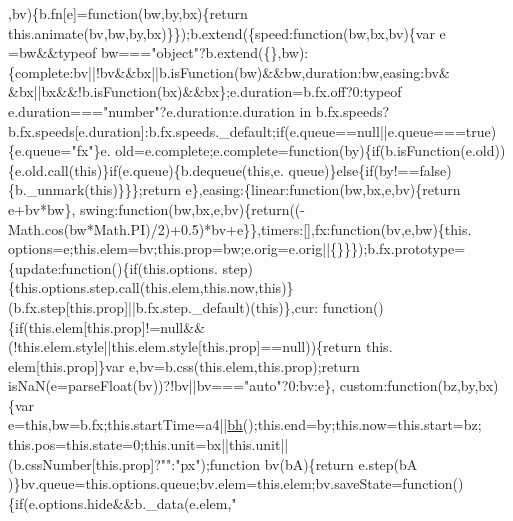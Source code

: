 \begin{DoxyCode}
      ,bv)\{b.fn[e]=\textcolor{keyword}{function}(bw,by,bx)\{\textcolor{keywordflow}{return} this.animate(bv,bw,by,bx)\}\});b.extend(\{speed:\textcolor{keyword}{function}(bw,bx,bv)\{var e
      =bw&&typeof bw===\textcolor{stringliteral}{"object"}?b.extend(\{\},bw):\{complete:bv||!bv&&bx||b.isFunction(bw)&&bw,duration:bw,easing:bv&
      &bx||bx&&!b.isFunction(bx)&&bx\};e.duration=b.fx.off?0:typeof e.duration===\textcolor{stringliteral}{"number"}?e.duration:e.duration in 
      b.fx.speeds?b.fx.speeds[e.duration]:b.fx.speeds.\_default;\textcolor{keywordflow}{if}(e.queue==null||e.queue===\textcolor{keyword}{true})\{e.queue=\textcolor{stringliteral}{"fx"}\}e.
      old=e.complete;e.complete=\textcolor{keyword}{function}(by)\{\textcolor{keywordflow}{if}(b.isFunction(e.old))\{e.old.call(\textcolor{keyword}{this})\}\textcolor{keywordflow}{if}(e.queue)\{b.dequeue(\textcolor{keyword}{this},e.
      queue)\}\textcolor{keywordflow}{else}\{\textcolor{keywordflow}{if}(by!==\textcolor{keyword}{false})\{b.\_unmark(\textcolor{keyword}{this})\}\}\};\textcolor{keywordflow}{return} e\},easing:\{linear:\textcolor{keyword}{function}(bw,bx,e,bv)\{\textcolor{keywordflow}{return} e+bv*bw\},
      swing:\textcolor{keyword}{function}(bw,bx,e,bv)\{\textcolor{keywordflow}{return}((-Math.cos(bw*Math.PI)/2)+0.5)*bv+e\}\},timers:[],fx:\textcolor{keyword}{function}(bv,e,bw)\{this.
      options=e;this.elem=bv;this.prop=bw;e.orig=e.orig||\{\}\}\});b.fx.prototype=\{update:\textcolor{keyword}{function}()\{\textcolor{keywordflow}{if}(this.options.
      step)\{this.options.step.call(this.elem,this.now,\textcolor{keyword}{this})\}(b.fx.step[this.prop]||b.fx.step.\_default)(\textcolor{keyword}{this})\},cur:\textcolor{keyword}{
      function}()\{\textcolor{keywordflow}{if}(this.elem[this.prop]!=null&&(!this.elem.style||\textcolor{keyword}{this}.elem.style[\textcolor{keyword}{this}.prop]==null))\{\textcolor{keywordflow}{return} this.
      elem[this.prop]\}var e,bv=b.css(this.elem,this.prop);\textcolor{keywordflow}{return} isNaN(e=parseFloat(bv))?!bv||bv===\textcolor{stringliteral}{"auto"}?0:bv:e\},
      custom:\textcolor{keyword}{function}(bz,by,bx)\{var e=\textcolor{keyword}{this},bw=b.fx;this.startTime=a4||\hyperlink{jquery_8js_a6fc9115e5c9c910cae480abf0a8c7ae3}{bh}();this.end=by;this.now=this.start=bz;
      this.pos=this.state=0;this.unit=bx||this.unit||(b.cssNumber[this.prop]?\textcolor{stringliteral}{""}:\textcolor{stringliteral}{"px"});\textcolor{keyword}{function} bv(bA)\{\textcolor{keywordflow}{return} e.step(bA
      )\}bv.queue=this.options.queue;bv.elem=this.elem;bv.saveState=\textcolor{keyword}{function}()\{\textcolor{keywordflow}{if}(e.options.hide&&b.\_data(e.elem,\textcolor{stringliteral}{"
}
\end{DoxyCode}
